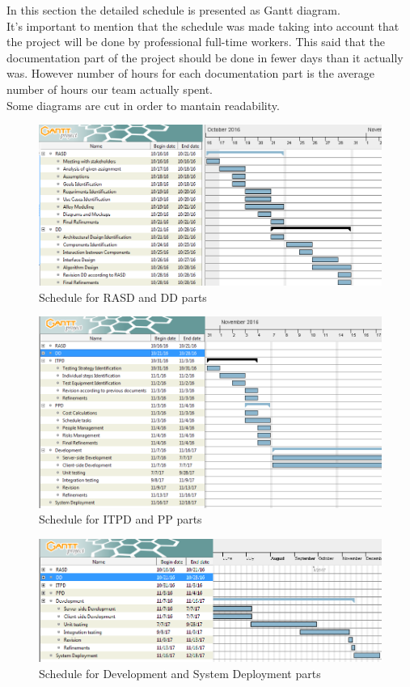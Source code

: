 

In this section the detailed schedule is presented as Gantt diagram.\\
It's important to mention that the schedule was made taking into account that the project will be done by professional full-time workers. This said that the documentation part of the project should be done in fewer days than it actually was. However number of hours for each documentation part is the average number of hours our team actually spent.\\
Some diagrams are cut in order to mantain readability.\\
 
	\begin{figure}[h]
		\includegraphics[scale=0.55]{img/Sched1.png}
		\caption{Schedule for RASD and DD parts}
	\end{figure}
\newpage
	\begin{figure}[h]
		\includegraphics[scale=0.55]{img/Sched2.png}
		\caption{Schedule for ITPD and PP parts}
	\end{figure}
	\begin{figure}[h]
		\includegraphics[scale=0.55]{img/Sched3.png}
		\caption{Schedule for Development and System Deployment parts}
	\end{figure}